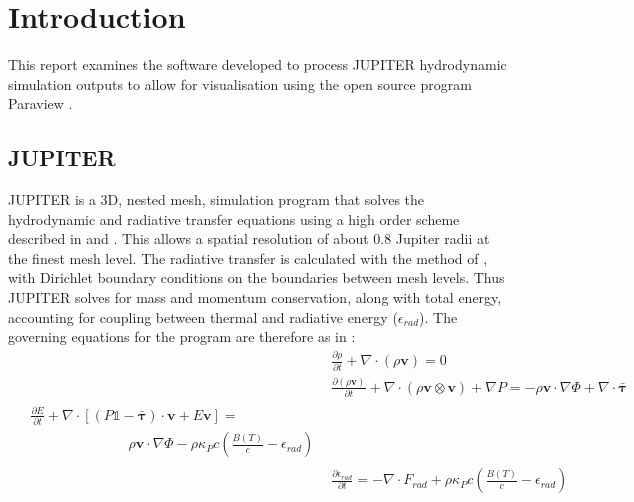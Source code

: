 \documentclass[twocolumn]{aastex62}
\begin{document}
\section{Introduction} \label{sec:intro}
This report examines the software developed to process JUPITER hydrodynamic simulation outputs to allow for visualisation using the open source program Paraview \cite{para}.
\subsection{JUPITER}\label{sec:jup}
JUPITER is a 3D, nested mesh, simulation program that solves the hydrodynamic and radiative transfer equations using a high order \cite{MR0119433} scheme described in \cite{Szulagyi2016} \cite{Szulagyi2014} and \cite{DeVal-Borro2006}. 
This allows a spatial resolution of about 0.8 Jupiter radii at the finest mesh level. 
The radiative transfer is calculated with the method of \cite{comm2011}, with Dirichlet boundary conditions on the boundaries between mesh levels.
Thus JUPITER solves for mass and momentum conservation, along with total energy, accounting for coupling between thermal and radiative energy ($\epsilon_{rad}$). The governing equations for the program are therefore as in \cite{Szulagyi2016}:
\begin{align}\label{eqns:hydro}
&\frac{\partial\rho}{\partial t} + \nabla \cdot \left(\rho\mathbf{v}\right) = 0\\
&\frac{\partial\left(\rho\mathbf{v}\right)}{\partial t} + \nabla \cdot \left(\rho\mathbf{v} \otimes \mathbf{v}\right) + \nabla P = -\rho\mathbf{v}\cdot\nabla\Phi + \nabla \cdot \bm{\bar{\tau}}\\
\begin{split}
&\frac{\partial E}{\partial t} + \nabla\cdot\left[\left(P \mathds{1}- \bm{\bar{\tau}} \right) \cdot \mathbf{v} + E\mathbf{v}\right] = \\&\qquad\qquad\qquad\quad\rho \mathbf{v}\cdot\nabla\Phi - \rho\kappa_{P}c\left(\frac{B\left(T\right)}{c} - \epsilon_{rad}\right)
\end{split}\\
&\frac{\partial \epsilon_{rad}}{\partial t} = -\nabla \cdot F_{rad} + \rho\kappa_{P}c\left(\frac{B\left(T\right)}{c} - \epsilon_{rad}\right)
\end{align}
\end{document}
